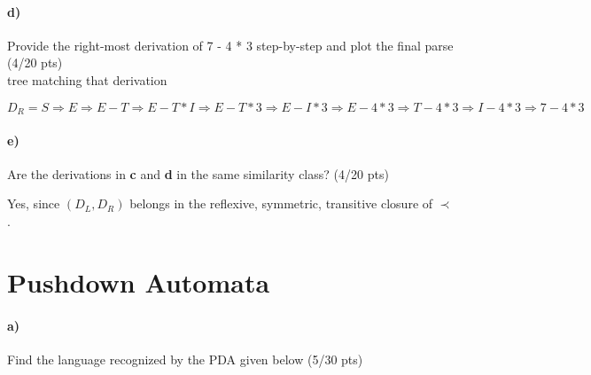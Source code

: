 \documentclass[a4paper,12pt]{article}
\begin{document}
\paragraph{d)} Provide the right-most derivation of 7 - 4 * 3 step-by-step and plot the final parse \hfill \small{(4/20 pts)} \\
 tree matching that derivation \\
 
\begin{tcolorbox}
$
D_R = 
S \Rightarrow
E \Rightarrow
E - T \Rightarrow
E - T * I \Rightarrow
E - T * 3 \Rightarrow
E - I * 3 \Rightarrow
E - 4 * 3 \Rightarrow
T - 4 * 3 \Rightarrow
I - 4 * 3 \Rightarrow
7 - 4 * 3
$
\begin{center}
\end{center}
\end{tcolorbox}


\paragraph{e)} Are the derivations in \textbf{c} and \textbf{d} in the same similarity class?  \hfill \small{(4/20 pts)} \\

\begin{tcolorbox}
Yes, since $(D_L, D_R)$ belongs in the reflexive, symmetric, transitive closure of $\prec$.
\end{tcolorbox}


\newpage
\section{Pushdown Automata \hfill {}}

\paragraph{a)} 
Find the language recognized by the PDA given below \hfill \small{(5/30 pts)} \\
\end{document}
